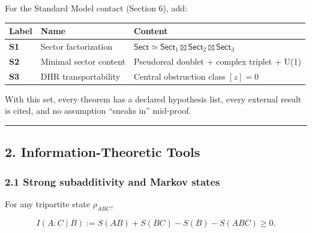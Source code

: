 \documentclass[
]{article}
\newcounter{none} %
\begin{document}
For the Standard Model contact (Section 6), add:

{\def\LTcaptype{none} %
\begin{longtable}[]{@{}
  >{\raggedright\arraybackslash}p{}
  >{\raggedright\arraybackslash}p{}
  >{\raggedright\arraybackslash}p{}@{}}
\toprule\noalign{}
\begin{minipage}[b]{\linewidth}\raggedright
Label
\end{minipage} & \begin{minipage}[b]{\linewidth}\raggedright
Name
\end{minipage} & \begin{minipage}[b]{\linewidth}\raggedright
Content
\end{minipage} \\
\midrule\noalign{}
\endhead
\bottomrule\noalign{}
\endlastfoot
\textbf{S1} & Sector factorization &
\(\mathsf{Sect} \simeq \mathsf{Sect}_1 \boxtimes \mathsf{Sect}_2 \boxtimes \mathsf{Sect}_3\) \\
\textbf{S2} & Minimal sector content & Pseudoreal doublet + complex
triplet + U(1) \\
\textbf{S3} & DHR transportability & Central obstruction class
\([z] = 0\) \\
\end{longtable}
}

With this set, every theorem has a declared hypothesis list, every
external result is cited, and no assumption ``sneaks in'' mid-proof.

\begin{center}\rule{0.5\linewidth}{0.5pt}\end{center}

\subsection{2. Information-Theoretic
Tools}\label{information-theoretic-tools}

\subsubsection{2.1 Strong subadditivity and Markov
states}\label{strong-subadditivity-and-markov-states}

For any tripartite state \(\rho_{ABC}\),

\[
I(A:C \mid B) := S(AB) + S(BC) - S(B) - S(ABC) \ge 0.
\]
\end{document}
